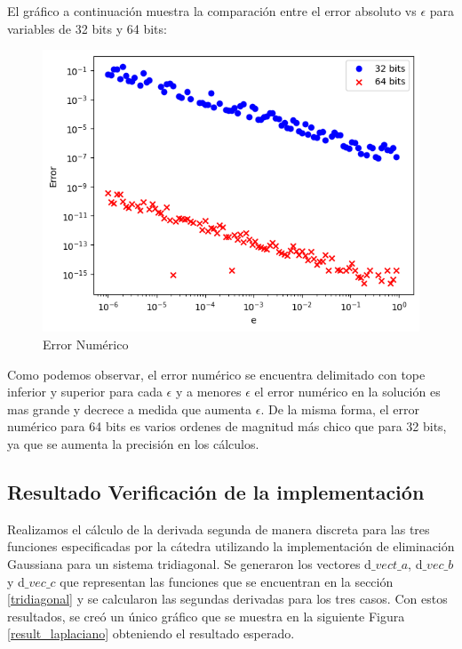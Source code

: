 El gráfico a continuación muestra la comparación entre el error absoluto vs $\epsilon$ para variables de 32 bits y 64 bits:

\begin{figure}[htbp]
\centerline{\includegraphics[scale=0.50]{./img/error_numerico_32vs64.png}}
\caption{Error Numérico}
\label{result_errorNumerico}
\end{figure}

Como podemos observar, el error numérico se encuentra delimitado con tope inferior y superior para cada $\epsilon$ y a menores $\epsilon$ el error numérico en la solución es mas grande y decrece a medida que aumenta $\epsilon$. De la misma forma, el error numérico para 64 bits es varios ordenes de magnitud más chico que para 32 bits, ya que se aumenta la precisión en los cálculos.

\subsection{Resultado Verificación de la implementación}
\label{resultados derivada}
Realizamos el cálculo de la derivada segunda de manera discreta para las tres funciones especificadas por la cátedra utilizando la implementación de eliminación Gaussiana para un sistema tridiagonal.
Se generaron los vectores d$\_vect\_a$, d$\_vec\_b$  y d$\_vec\_c$ que representan las funciones que se encuentran en la sección \ref{tridiagonal} y se calcularon las segundas derivadas para los tres casos.
Con estos resultados, se creó un único gráfico que se muestra en la siguiente Figura \ref{result_laplaciano} obteniendo el resultado esperado.


